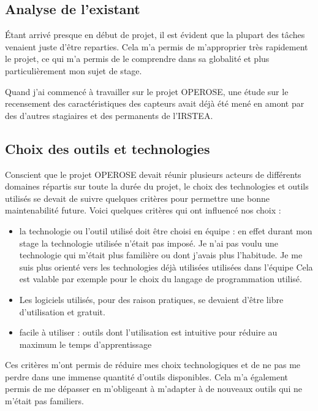 \subsection{Analyse de l’existant} 
Étant arrivé presque en début de projet, il est évident que la plupart des tâches venaient juste d’être reparties. Cela m’a permis de m’approprier très rapidement le projet, ce qui m’a permis de le comprendre dans sa globalité et plus particulièrement mon sujet de stage.   

Quand j’ai commencé à travailler sur le projet OPEROSE, une étude sur le recensement des caractéristiques des capteurs avait déjà été mené en amont par des d’autres stagiaires et des permanents de l’IRSTEA. 

\subsection{Choix des outils et technologies}

Conscient que le projet OPEROSE devait réunir plusieurs acteurs de différents domaines répartis sur toute la durée du projet, le choix des technologies et outils utilisés se devait de suivre quelques critères pour permettre une bonne maintenabilité future. Voici quelques critères qui ont influencé nos choix : 
\begin{itemize}
 

  \item la technologie ou l’outil utilisé doit être choisi en équipe : en effet durant mon stage la technologie  utilisée n’était pas imposé. Je n’ai pas  voulu une technologie qui m’était plus familière ou dont j’avais plus l’habitude. Je me suis plus orienté vers les technologies déjà utilisées utilisées dans l'équipe Cela est valable par exemple pour le choix du langage de programmation utilisé. 

  \item Les logiciels utilisés, pour des raison pratiques, se devaient d’être libre d’utilisation et gratuit. 

   \item facile à utiliser : outils dont l’utilisation est intuitive pour réduire au maximum le temps d’apprentissage 
\end{itemize}
Ces critères m'ont permis de réduire mes choix technologiques et de ne pas me perdre dans une immense quantité d'outils disponibles. Cela m'a également permis de me dépasser en m'obligeant à m'adapter à de nouveaux outils qui ne m'était pas familiers.

